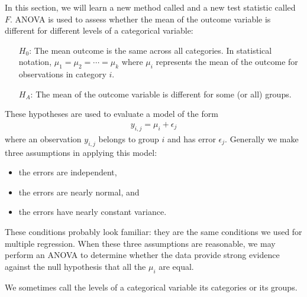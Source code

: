 In this section, we will learn a new method called  and a new test statistic called $F$. ANOVA is used to assess whether the mean of the outcome variable is different for different levels of a categorical variable:
\begin{itemize}
\setlength{\itemsep}{0mm}
\item[$H_0$:] The mean outcome is the same across all categories. In statistical notation, $\mu_1 = \mu_2 = \cdots = \mu_k$ where $\mu_i$ represents the mean of the outcome for observations in category $i$.
\item[$H_A$:] The mean of the outcome variable is different for some (or all) groups.
\end{itemize}
These hypotheses are used to evaluate a model of the form
\begin{align} 
y_{i,j} = \mu_i + \epsilon_{j} \label{anovaModelForMeans}
\end{align}
where an observation $y_{i,j}$ belongs to group $i$ and has error $\epsilon_j$. Generally we make three assumptions in applying this model:
\begin{itemize}
\setlength{\itemsep}{0mm}
\item the errors are independent,
\item the errors are nearly normal, and
\item the errors have nearly constant variance.
\end{itemize}
These conditions probably look familiar: they are the same conditions we used for multiple regression. When these three assumptions are reasonable, we may perform an ANOVA to determine whether the data provide strong evidence against the null hypothesis that all the $\mu_i$ are equal.

\begin{tipBox}{
We sometimes call the levels of a categorical variable its categories or its groups.}
\end{tipBox}

